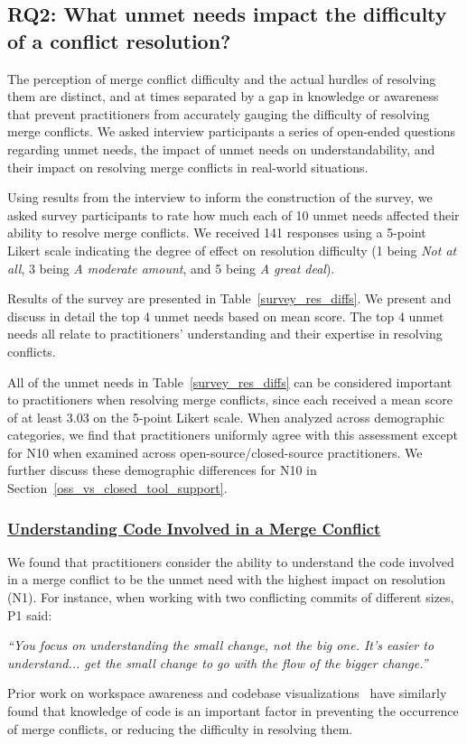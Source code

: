 \subsection{\textbf{RQ2:} What unmet needs impact the difficulty of a conflict resolution?}\label{RQ2}

The perception of merge conflict difficulty and the actual hurdles of resolving them are distinct, and at times separated by a gap in knowledge or awareness that prevent practitioners from accurately gauging the difficulty of resolving merge conflicts.
We asked interview participants a series of open-ended questions regarding unmet needs, the impact of unmet needs on understandability, and their impact on resolving merge conflicts in real-world situations.

Using results from the interview to inform the construction of the survey, we asked survey participants to rate how much each of 10 unmet needs affected their ability to resolve merge conflicts.
We received 141 responses using a 5-point Likert scale indicating the degree of effect on resolution difficulty (1 being \textit{Not at all}, 3 being \textit{A moderate amount}, and 5 being \textit{A great deal}).

Results of the survey are presented in Table~\ref{survey_res_diffs}.
We present and discuss in detail the top 4 unmet needs based on mean score.
The top 4 unmet needs all relate to practitioners' understanding and their expertise in resolving conflicts. 

All of the unmet needs in Table~\ref{survey_res_diffs} can be considered important to practitioners when resolving merge conflicts, since each received a mean score of at least 3.03 on the 5-point Likert scale.
When analyzed across demographic categories, we find that practitioners uniformly agree with this assessment except for N10 when examined across open-source/closed-source practitioners.
We further discuss these demographic differences for N10 in Section~\ref{oss_vs_closed_tool_support}.

\subsubsection{\underline{Understanding Code Involved in a Merge Conflict}}
We found that practitioners consider the ability to understand the code involved in a merge conflict to be the unmet need with the highest impact on resolution (N1).
For instance, when working with two conflicting commits of different sizes, P1 said:
\begin{displayquote}
\textit{``You focus on understanding the small change, not the big one. It's easier to understand... get the small change to go with the flow of the bigger change.''}
\end{displayquote}
Prior work on workspace awareness and codebase visualizations~\cite{palantir}\cite{lanza_manhattan} have similarly found that knowledge of code is an important factor in preventing the occurrence of merge conflicts, or reducing the difficulty in resolving them.

